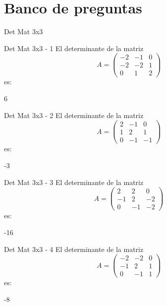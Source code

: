 \documentclass[a4,11pt]{aleph-notas}
\begin{document}
\section{Banco de preguntas}

\begin{quiz}{Det Mat 3x3}

\begin{numerical}[tolerance=0]%
    {Det Mat 3x3 - 1}
    El determinante de la matriz
    \[
        A = \begin{pmatrix} -2 & -1 & 0 \\ -2 & -2 & 1 \\ 0 & 1 & 2 \end{pmatrix}
    \]
    es:
    \item[] 6
\end{numerical}

\begin{numerical}[tolerance=0]%
    {Det Mat 3x3 - 2}
    El determinante de la matriz
    \[
        A = \begin{pmatrix} 2 & -1 & 0 \\ 1 & 2 & 1 \\ 0 & -1 & -1 \end{pmatrix}
    \]
    es:
    \item[] -3
\end{numerical}

\begin{numerical}[tolerance=0]%
    {Det Mat 3x3 - 3}
    El determinante de la matriz
    \[
        A = \begin{pmatrix} 2 & 2 & 0 \\ -1 & 2 & -2 \\ 0 & -1 & -2 \end{pmatrix}
    \]
    es:
    \item[] -16
\end{numerical}

\begin{numerical}[tolerance=0]%
    {Det Mat 3x3 - 4}
    El determinante de la matriz
    \[
        A = \begin{pmatrix} -2 & -2 & 0 \\ -1 & 2 & 1 \\ 0 & -1 & 1 \end{pmatrix}
    \]
    es:
    \item[] -8
\end{numerical}


\end{quiz}
\end{document}
